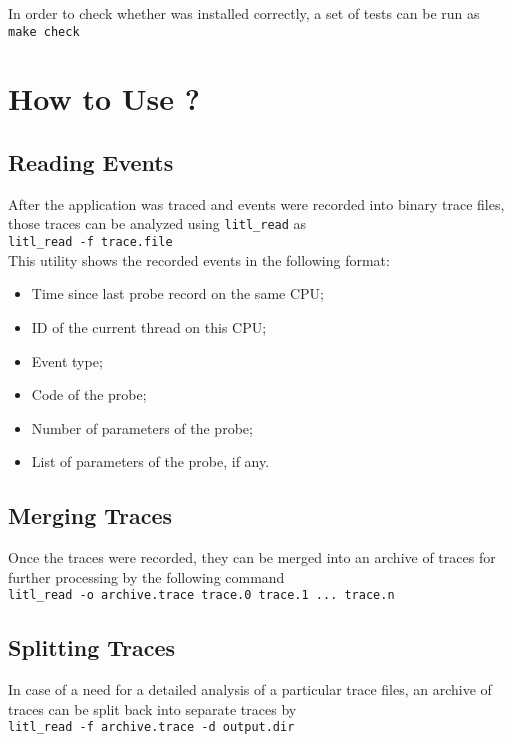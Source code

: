 In order to check whether \litl{} was installed correctly, a set of tests can be 
run as\\
    \hspace*{0.9cm}\texttt{make check}


\chapter{How to Use \litl{}?}
\section{Reading Events}
After the application was traced and events were recorded into binary trace 
files, those traces can be analyzed using \texttt{litl\_read} as\\
    \hspace*{0.9cm}\texttt{litl\_read -f trace.file}\\
This utility shows the recorded events in the following format:
\begin{itemize}
 \item Time since last probe record on the same CPU;
 \item ID of the current thread on this CPU;
 \item Event type;
 \item Code of the probe;
 \item Number of parameters of the probe;
 \item List of parameters of the probe, if any.
\end{itemize}

\section{Merging Traces}
Once the traces were recorded, they can be merged into an archive of traces for
further processing by the following command\\
    \hspace*{0.9cm}\texttt{litl\_read  -o archive.trace trace.0 trace.1 ... trace.n}

\section{Splitting Traces}
In case of a need for a detailed analysis of a particular trace files, an archive
of traces can be split back into separate traces by\\
\hspace*{0.9cm}\texttt{litl\_read  -f archive.trace -d output.dir}

